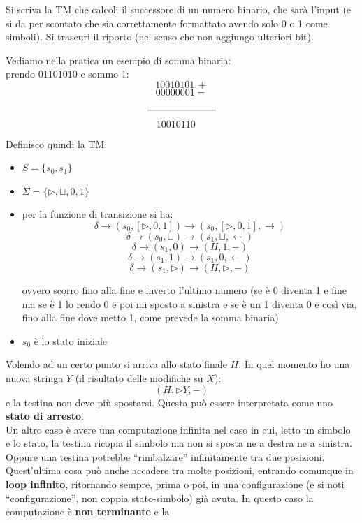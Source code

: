 \documentclass[a4paper,12pt, oneside]{book}
\begin{document}
\begin{esempio}
  Si scriva la TM che calcoli il successore di un numero binario, che sarà
  l'input (e si da per scontato che sia correttamente formattato avendo solo 0 o
  1 come simboli). Si trascuri il riporto (nel senso che non aggiungo ulteriori
  bit).\\
  \begin{shaded}
    Vediamo nella pratica un esempio di somma binaria:\\
    prendo $01101010$ e sommo 1:
    \[10010101 \, +\]
    \[00000001=\]
    \[\rule{70pt}{.4pt}\]
    \[10010110\,\,\,\,\,\,\,\]
  \end{shaded}
  Definisco quindi la TM:
  \begin{itemize}
    \item $S=\{s_0,s_1\}$
    \item $\Sigma =\{\triangleright, \sqcup, 0,1\}$
    \item per la funzione di transizione si ha:
    \[\delta\to(s_0,[\triangleright, 0,1])\to(s_0,[\triangleright, 0,1],
      \rightarrow)\]
    \[\delta\to(s_0,\sqcup)\to(s_1,\sqcup,\leftarrow)\]
    \[\delta\to(s_1,0)\to(H,1,-)\]
    \[\delta\to(s_1,1)\to(s_1,0,\leftarrow)\]
    \[\delta\to(s_1,\triangleright)\to(H,\triangleright,-)\]

    ovvero scorro fino alla fine e inverto l'ultimo numero 
    (se è 0 diventa 1 e fine ma se è 1 lo rendo 0 e poi mi sposto a sinistra e
    se è un 1 diventa 0 e così via, fino alla
    fine dove metto 1, come prevede la somma binaria)
    \item $s_0$ è lo stato iniziale
  \end{itemize}
\end{esempio}
Volendo ad un certo punto si arriva allo stato finale $H$. In quel momento ho
una nuova stringa $Y$ (il risultato delle modifiche su $X$):
\[(H,\triangleright Y, -)\]
e la testina non deve più spostarsi. Questa può essere interpretata come uno
\textbf{stato di arresto}.\\
Un altro caso è avere una computazione infinita nel caso in cui, letto un
simbolo e lo stato, la testina ricopia il simbolo ma non si sposta ne a destra
ne a sinistra. Oppure una testina potrebbe ``rimbalzare'' infinitamente tra due
posizioni. Quest'ultima cosa può anche accadere tra molte posizioni, entrando
comunque in \textbf{loop infinito}, ritornando sempre, prima o poi, in una
configurazione (e si noti ``configurazione'', non coppia stato-simbolo) già
avuta. In questo caso la computazione è \textbf{non terminante} e la
\end{document}
